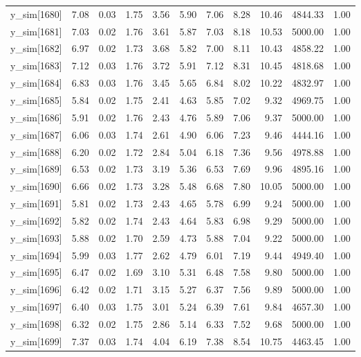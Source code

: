 \begin{table}[ht]
\begin{tabular}{rrrrrrrrrrr}
  y\_sim[1680] & 7.08 & 0.03 & 1.75 & 3.56 & 5.90 & 7.06 & 8.28 & 10.46 & 4844.33 & 1.00 \\ 
  y\_sim[1681] & 7.03 & 0.02 & 1.76 & 3.61 & 5.87 & 7.03 & 8.18 & 10.53 & 5000.00 & 1.00 \\ 
  y\_sim[1682] & 6.97 & 0.02 & 1.73 & 3.68 & 5.82 & 7.00 & 8.11 & 10.43 & 4858.22 & 1.00 \\ 
  y\_sim[1683] & 7.12 & 0.03 & 1.76 & 3.72 & 5.91 & 7.12 & 8.31 & 10.45 & 4818.68 & 1.00 \\ 
  y\_sim[1684] & 6.83 & 0.03 & 1.76 & 3.45 & 5.65 & 6.84 & 8.02 & 10.22 & 4832.97 & 1.00 \\ 
  y\_sim[1685] & 5.84 & 0.02 & 1.75 & 2.41 & 4.63 & 5.85 & 7.02 & 9.32 & 4969.75 & 1.00 \\ 
  y\_sim[1686] & 5.91 & 0.02 & 1.76 & 2.43 & 4.76 & 5.89 & 7.06 & 9.37 & 5000.00 & 1.00 \\ 
  y\_sim[1687] & 6.06 & 0.03 & 1.74 & 2.61 & 4.90 & 6.06 & 7.23 & 9.46 & 4444.16 & 1.00 \\ 
  y\_sim[1688] & 6.20 & 0.02 & 1.72 & 2.84 & 5.04 & 6.18 & 7.36 & 9.56 & 4978.88 & 1.00 \\ 
  y\_sim[1689] & 6.53 & 0.02 & 1.73 & 3.19 & 5.36 & 6.53 & 7.69 & 9.96 & 4895.16 & 1.00 \\ 
  y\_sim[1690] & 6.66 & 0.02 & 1.73 & 3.28 & 5.48 & 6.68 & 7.80 & 10.05 & 5000.00 & 1.00 \\ 
  y\_sim[1691] & 5.81 & 0.02 & 1.73 & 2.43 & 4.65 & 5.78 & 6.99 & 9.24 & 5000.00 & 1.00 \\ 
  y\_sim[1692] & 5.82 & 0.02 & 1.74 & 2.43 & 4.64 & 5.83 & 6.98 & 9.29 & 5000.00 & 1.00 \\ 
  y\_sim[1693] & 5.88 & 0.02 & 1.70 & 2.59 & 4.73 & 5.88 & 7.04 & 9.22 & 5000.00 & 1.00 \\ 
  y\_sim[1694] & 5.99 & 0.03 & 1.77 & 2.62 & 4.79 & 6.01 & 7.19 & 9.44 & 4949.40 & 1.00 \\ 
  y\_sim[1695] & 6.47 & 0.02 & 1.69 & 3.10 & 5.31 & 6.48 & 7.58 & 9.80 & 5000.00 & 1.00 \\ 
  y\_sim[1696] & 6.42 & 0.02 & 1.71 & 3.15 & 5.27 & 6.37 & 7.56 & 9.89 & 5000.00 & 1.00 \\ 
  y\_sim[1697] & 6.40 & 0.03 & 1.75 & 3.01 & 5.24 & 6.39 & 7.61 & 9.84 & 4657.30 & 1.00 \\ 
  y\_sim[1698] & 6.32 & 0.02 & 1.75 & 2.86 & 5.14 & 6.33 & 7.52 & 9.68 & 5000.00 & 1.00 \\ 
  y\_sim[1699] & 7.37 & 0.03 & 1.74 & 4.04 & 6.19 & 7.38 & 8.54 & 10.75 & 4463.45 & 1.00 \\ 

\end{tabular}
\end{table}
